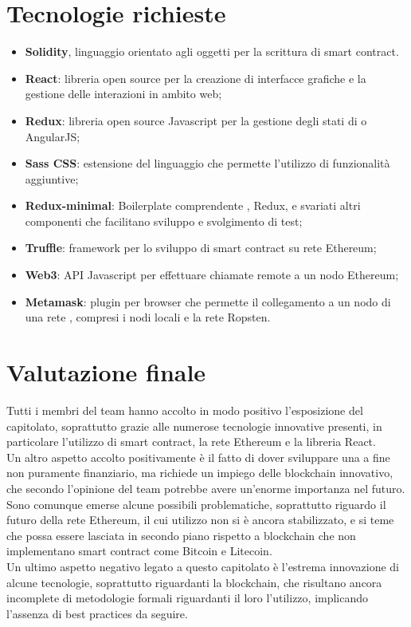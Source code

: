 \documentclass[StudioDiFattibilità.tex]{subfiles}
\begin{document}
\section{Tecnologie richieste}
\begin{itemize}
	\item \textbf{Solidity}, linguaggio orientato agli oggetti per la scrittura di smart contract.
	\item \textbf{React}: libreria open source  per la creazione di interfacce grafiche e la gestione delle interazioni in ambito web;
	\item \textbf{Redux}: libreria open source Javascript per la gestione degli stati di  o AngularJS;
	\item \textbf{Sass CSS}: estensione del linguaggio  che permette l'utilizzo di funzionalità aggiuntive;
	\item \textbf{Redux-minimal}: Boilerplate comprendente , Redux,  e svariati altri componenti che facilitano sviluppo e svolgimento di test;
	\item \textbf{Truffle}: framework per lo sviluppo di smart contract su rete Ethereum;
	\item \textbf{Web3}: API Javascript per effettuare chiamate remote a un nodo Ethereum;
	\item \textbf{Metamask}: plugin per browser che permette il collegamento a un nodo di una rete , compresi i nodi locali e la rete Ropsten.
\end{itemize}
\section{Valutazione finale}
Tutti i membri del team hanno accolto in modo positivo l'esposizione del capitolato, soprattutto grazie alle numerose tecnologie innovative presenti, in particolare l'utilizzo di smart contract, la rete Ethereum e la libreria React.\\
Un altro aspetto accolto positivamente è il fatto di dover sviluppare una  a fine non puramente finanziario, ma richiede un impiego delle blockchain innovativo, che secondo l'opinione del team potrebbe avere un'enorme importanza nel futuro.\\
Sono comunque emerse alcune possibili problematiche, soprattutto riguardo il futuro della rete Ethereum, il cui utilizzo non si è ancora stabilizzato, e si teme che possa essere lasciata in secondo piano rispetto a blockchain che non implementano smart contract come Bitcoin e Litecoin.\\
Un ultimo aspetto negativo legato a questo capitolato è l'estrema innovazione di alcune tecnologie, soprattutto riguardanti la blockchain, che risultano ancora incomplete di metodologie formali riguardanti il loro l'utilizzo, implicando l'assenza di best practices da seguire.
\end{document}
